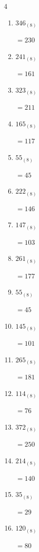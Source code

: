 \begin{multicols}{4}
\begin{enumerate}
        $=86$

  \item $346_{(8)}$

        $=230$

  \item $241_{(8)}$

        $=161$

  \item $323_{(8)}$

        $=211$

  \item $165_{(8)}$

        $=117$

  \item $55_{(8)}$

        $=45$

  \item $222_{(8)}$

        $=146$

  \item $147_{(8)}$

        $=103$

  \item $261_{(8)}$

        $=177$

\columnbreak %

  \item $55_{(8)}$

        $=45$

  \item $145_{(8)}$

        $=101$

  \item $265_{(8)}$

        $=181$

  \item $114_{(8)}$

        $=76$

  \item $372_{(8)}$

        $=250$

  \item $214_{(8)}$

        $=140$

  \item $35_{(8)}$

        $=29$

  \item $120_{(8)}$

        $=80$


\end{enumerate}
\end{multicols}
